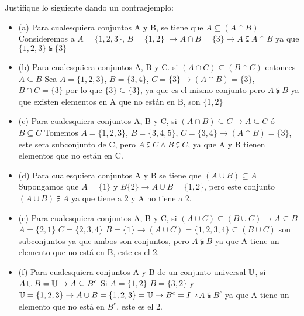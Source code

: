 \section{}
Justifique lo siguiente dando un contraejemplo:
\begin{itemize}
	\item (a) Para cualesquiera conjuntos A y B, se tiene que $A \subseteq (A \cap B)$\newline
	Consideremos a $A = \{ 1,2,3 \}$, $B = \{1,2\}$\newline
	$\rightarrow A \cap B = \{ 3\} \rightarrow A \subsetneqq A \cap B$ ya que $\{1,2,3\} \subsetneqq \{3\}$
	
	\item (b) Para cualesquiera conjuntos A, B y C. si $(A \cap C) \subseteq (B \cap C)$ entonces $A \subseteq B$\newline
	Sea $A = \{ 1,2,3 \}$, $B = \{3,4\}$, $C= \{3\}  \rightarrow (A \cap B) = \{3\}$,\newline
	$B \cap C = \{3\}$ por lo que $\{3\} \subseteq \{3\}$, ya que es el mismo conjunto pero $A \subsetneqq B$ ya que existen elementos en A que no están en B, son $\{1,2\}$
	
	\item (c) Para cualesquiera conjuntos A, B y C, si $(A \cap B) \subseteq C \rightarrow A \subseteq C$ ó $B \subseteq C$\newline
		Tomemos $A = \{ 1,2,3 \}$, $B = \{3,4,5\}$, $C = \{3,4\} \rightarrow (A \cap B) = \{ 3\}$, este sera subconjunto de C, pero $A \subsetneqq C \wedge B \subsetneqq C$, ya que A y B tienen elementos que no están en C.
		
	\item (d) Para cualesquiera conjuntos A y B se tiene que $(A \cup B) \subseteq A$\newline
	Supongamos que $A=\{1\}$ y $B \{ 2\} \rightarrow A \cup B = \{1,2\}$, pero este conjunto $(A \cup B)\subsetneqq A$ ya que tiene a 2 y A no tiene a 2.
	
	\item (e) Para cualesquiera conjuntos A, B y C, si $(A \cup C) \subseteq (B \cup C) \rightarrow A \subseteq B$\newline
	$A = \{2,1\}$ $C = \{2,3,4\}$ $B = \{1\} \rightarrow (A \cup C) = \{1,2,3,4\} \subseteq (B \cup C)$ son subconjuntos ya que ambos son conjuntos, pero $A \subsetneqq B$ ya que A tiene un elemento que no está en B, este es el 2.
	
	\item (f) Para cualesquiera conjuntos A y B de un conjunto universal $\mathbb{U}$, si $A \cup B = \mathbb{U} \rightarrow A \subseteq B^c$\newline
	Si $A = \{1,2\}$ $B = \{3,2\}$ y $\mathbb{U} = \{1,2,3\} \rightarrow A \cup B = \{1,2,3\} = \mathbb{U} \rightarrow B^c = I$\newline
	$\therefore A \subsetneqq B^c$ ya que A tiene un elemento que no está en $B^c$, este es el 2.
	

\end{itemize}
